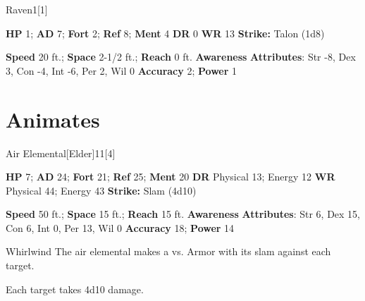   
  \begin{monsection}{Raven}{1}[1]
    \vspace{-1em}\vspace{-1em}
    \begin{spellcontent}
      \begin{spelltargetinginfo}
        \pari \textbf{HP} 1;
          \textbf{AD} 7;
          \textbf{Fort} 2;
          \textbf{Ref} 8;
          \textbf{Ment} 4
        \pari \textbf{DR} 0
        \pari \textbf{WR} 13
        \pari \textbf{Strike:}
            Talon  (1d8)
      \end{spelltargetinginfo}
    \end{spellcontent}
    \begin{monsterfooter}
      \pari \textbf{Speed} 20 ft.;
        \textbf{Space} 2-1/2 ft.;
        \textbf{Reach} 0 ft.
      \pari \textbf{Awareness} 
      \pari \textbf{Attributes}:
        Str -8, Dex 3, Con -4,
        Int -6, Per 2, Wil 0
      \pari \textbf{Accuracy} 2;
        \textbf{Power} 1
    \end{monsterfooter}
  \end{monsection}
  
  
        \section{Animates}
      
  \begin{monsection}{Air Elemental}[Elder]{11}[4]
    \vspace{-1em}\vspace{-1em}
    \begin{spellcontent}
      \begin{spelltargetinginfo}
        \pari \textbf{HP} 7;
          \textbf{AD} 24;
          \textbf{Fort} 21;
          \textbf{Ref} 25;
          \textbf{Ment} 20
        \pari \textbf{DR} Physical 13; Energy 12
        \pari \textbf{WR} Physical 44; Energy 43
        \pari \textbf{Strike:}
            Slam  (4d10)
      \end{spelltargetinginfo}
    \end{spellcontent}
    \begin{monsterfooter}
      \pari \textbf{Speed} 50 ft.;
        \textbf{Space} 15 ft.;
        \textbf{Reach} 15 ft.
      \pari \textbf{Awareness} 
      \pari \textbf{Attributes}:
        Str 6, Dex 15, Con 6,
        Int 0, Per 13, Wil 0
      \pari \textbf{Accuracy} 18;
        \textbf{Power} 14
    \end{monsterfooter}
  \end{monsection}
  \begin{freeability}{Whirlwind}
      The air elemental makes a 
         vs. Armor
        with its slam against each target.
    
    \hit Each target takes 4d10  damage.
    \end{freeability}
  
